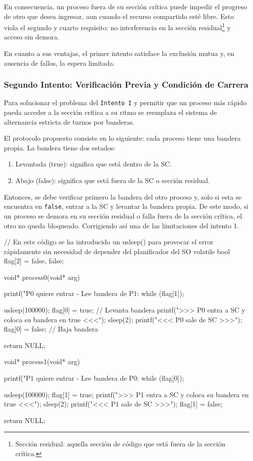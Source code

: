 En consecuencia, un proceso fuera de su sección crítica puede impedir el progreso de otro que desea ingresar, aun cuando el recurso compartido esté libre. Esto viola el segundo y cuarto requisito: no interferencia en la sección residual\footnote{Sección residual: aquella sección de código que está fuera de la sección crítica.} y acceso sin demora.

En cuanto a sus ventajas, el primer intento satisface la exclusión mutua y, en ausencia de fallos, la espera limitada. 

\subsubsection{Segundo Intento: Verificación Previa y Condición de Carrera}

Para solucionar el problema del \texttt{Intento I} y permitir que un proceso más rápido pueda acceder a la sección crítica a su ritmo se reemplaza el sistema de alternancia estricta de turnos por banderas.

El protocolo propuesto consiste en lo siguiente: cada proceso tiene una bandera propia. La bandera tiene dos estados:
\begin{enumerate}
  \item Levantada (true): significa que está dentro de la SC.
  \item Abajo (false): significa que está fuera de la SC o sección residual.
\end{enumerate}
Entonces, se debe verificar primero la bandera del otro proceso y, solo si esta se encuentra en \texttt{false}, entrar a la SC y levantar la bandera propia. De este modo, si un proceso se demora en su sección residual o falla fuera de la sección crítica, el otro no queda bloqueado. Corrigiendo así una de las limitaciones del intento 1.

\begin{ccode}[title=Intento II]
// En este código se ha introducido un usleep() para provocar el error rápidamente sin necesidad de depender del planificador del SO
volatile bool flag[2] = {false, false};

void* process0(void* arg) {
  printf("P0 quiere entrar - Lee bandera de P1: %
  while (flag[1]); 

  usleep(100000); flag[0] = true; // Levanta bandera
  printf(">>> P0 entra a SC y coloca su bandera en true <<<\n");
  sleep(2);
  printf("<<< P0 sale de SC >>>\n");
  flag[0] = false; // Baja bandera

  return NULL;
}

void* process1(void* arg) {
  printf("P1 quiere entrar - Lee bandera de P0: %
  while (flag[0]);

  usleep(100000); flag[1] = true;
  printf(">>> P1 entra a SC y coloca su bandera en true <<<\n");
  sleep(2);
  printf("<<< P1 sale de SC >>>\n");
  flag[1] = false;

  return NULL;
}
\end{ccode}

